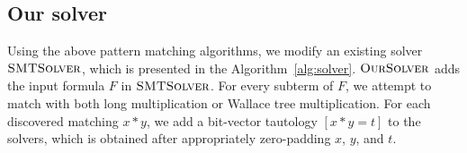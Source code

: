 \subsection{Our solver}


Using the above pattern matching algorithms, we modify an existing
solver $\textsc{SMTSolver}$, which
is presented in the Algorithm~\ref{alg:solver}.
%
$\textsc{OurSolver}$ adds the input formula $F$ in $\textsc{SMTSolver}$.
%
For every subterm of $F$, we attempt to match with both long multiplication
or Wallace tree multiplication.
%
For each discovered matching $x*y$, we add a bit-vector tautology $[x*y = t]$ 
to the solvers, which is obtained after
appropriately zero-padding $x$, $y$, and $t$.
%



